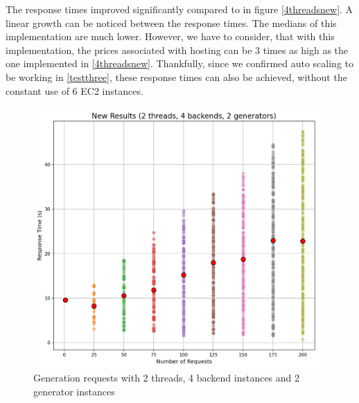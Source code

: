 			The response times improved significantly compared to in figure \ref{4threadsnew}. A linear growth can be noticed between the response times.
			The medians of this implementation are much lower. However, we have to consider, that with this implementation, the prices associated with hosting
			can be 3 times as high as the one implemented in \ref{4threadsnew}. Thankfully, since we confirmed auto scaling to be working in \ref{testthree},
			these response times can also be achieved, without the constant use of 6 EC2 instances.

			\begin{figure}[h]
				\begin{center}
					\includegraphics[scale=0.6]{include/imgs/2t_4w_2g_new.PNG}
					\caption{Generation requests with 2 threads, 4 backend instances and 2 generator instances}
					\label{2threads4web2gen}
				\end{center}
			\end{figure}

			


